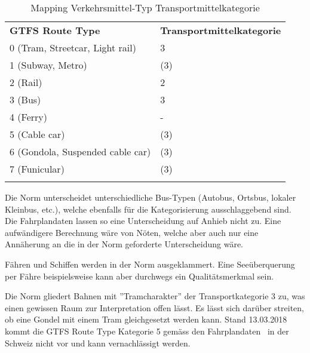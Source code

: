 \begin{longtable}[ht]{l l}
        \midrule
            \textbf{GTFS Route Type} 
            & \textbf{Transportmittelkategorie}\\
            
            0 (Tram, Streetcar, Light rail)
            & 3\\
            
            1 (Subway, Metro)
            & (3)\\
            
            2 (Rail)
            & 2\\
            
            3 (Bus)
            & 3\\
            
            4 (Ferry)
            & -\\
            
            5 (Cable car)
            & (3)\\
            
            6 (Gondola, Suspended cable car)
            & (3)\\
            
            7 (Funicular)
            & (3)\\            
        \bottomrule
    \caption{Mapping Verkehrsmittel-Typ Transportmittelkategorie}
    \label{table:Mapping Verkehrsmittel-Typ Transportmittelkategorie}
\end{longtable}

Die Norm unterscheidet unterschiedliche Bus-Typen (Autobus, Ortsbus, lokaler Kleinbus, etc.), welche ebenfalls für die Kategorisierung ausschlaggebend sind.
Die Fahrplandaten lassen so eine Unterscheidung auf Anhieb nicht zu.
Eine aufwändigere Berechnung wäre von Nöten, welche aber auch nur eine Annäherung an die in der Norm geforderte Unterscheidung wäre.

Fähren und Schiffen werden in der Norm ausgeklammert.
Eine Seeüberquerung per Fähre beispielsweise kann aber durchwegs ein Qualitätsmerkmal sein.

Die Norm gliedert Bahnen mit ''Tramcharakter'' der Transportkategorie 3 zu, was einen gewissen Raum zur Interpretation offen lässt.
Es lässt sich darüber streiten, ob eine Gondel mit einem Tram gleichgesetzt werden kann.
Stand 13.03.2018 kommt die GTFS Route Type Kategorie 5 gemäss den Fahrplandaten~\cite{geops_fahrplandaten} in der Schweiz nicht vor und kann vernachlässigt werden.

